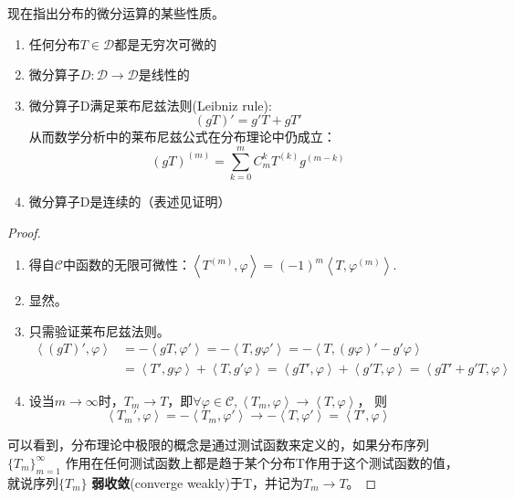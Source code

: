 \documentclass{ctexbook}
\begin{document}
现在指出分布的微分运算的某些性质\cite{zorich}。
\begin{theorem}[分布的微分运算的性质]
    \begin{enumerate}
        \quad
    \item 任何分布$T\in\mathcal{D} $都是无穷次可微的
    \item 微分算子$D:\mathcal{D} \to\mathcal{D} $是线性的
    \item 微分算子D满足莱布尼兹法则(Leibniz rule):
          \[\left(gT\right)'=g'T+gT'\]从而数学分析中的莱布尼兹公式在分布理论中仍成立：
          \[\left(gT\right)^{(m)}=\sum_{k=0}^{m}C_m^k T^{(k)}g^{(m-k)}\]
    \item 微分算子D是连续的（表述见证明）
\end{enumerate}
\end{theorem}
\begin{proof}
\begin{enumerate}
    \item 得自$\mathcal{C} $中函数的无限可微性：$\left\langle T^{(m)},\varphi\right\rangle=(-1)^m\left\langle T,\varphi^{(m)}\right\rangle$.
    \item 显然。
    \item 只需验证莱布尼兹法则。
          \begin{align*}
              \left\langle (gT)',\varphi\right\rangle & =-\left\langle gT,\varphi'\right\rangle=-\left\langle T,g\varphi'\right\rangle=-\left\langle T,(g\varphi)'-g'\varphi\right\rangle                                            \\
                                           & =\left\langle T',g\varphi\right\rangle+\left\langle T,g'\varphi\right\rangle=\left\langle gT',\varphi\right\rangle+\left\langle g'T,\varphi\right\rangle=\left\langle gT'+g'T,\varphi\right\rangle
          \end{align*}
    \item 设当$m\to\infty$时，$T_m\to T$，即$\forall\varphi\in\mathcal{C} ,\left\langle T_m,\varphi\right\rangle\to\left\langle T,\varphi\right\rangle$，
          则\[\left\langle T_m',\varphi\right\rangle=-\left\langle T_m,\varphi'\right\rangle\to-\left\langle T,\varphi'\right\rangle=\left\langle T',\varphi\right\rangle\]
\end{enumerate}
可以看到，分布理论中极限的概念是通过测试函数来定义的，如果分布序列$\{T_m\}_{m=1}^{\infty}$
作用在任何测试函数上都是趋于某个分布T作用于这个测试函数的值，就说序列$\{T_m\}$
\textbf{弱收敛}(converge weakly)于T，并记为$T_m\to T$\cite{folland}。
\end{proof}
\end{document}

